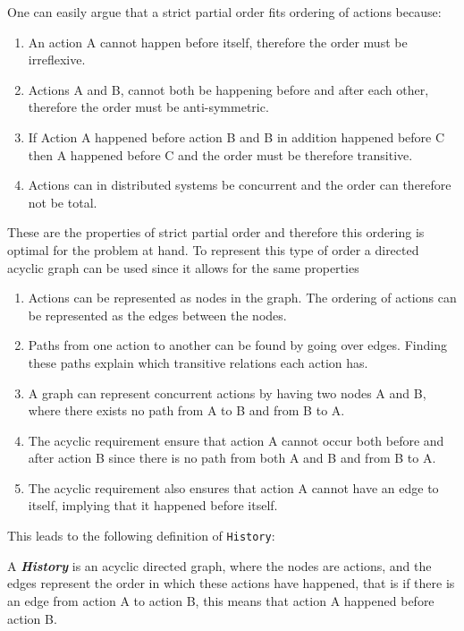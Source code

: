 	\newpar One can easily argue that a strict partial order fits ordering of actions because:
	\begin{enumerate}
		\item An action A cannot happen before itself, therefore the order must be irreflexive.
		\item Actions A and B, cannot both be happening before and after each other, therefore the order must be anti-symmetric.
		\item If Action A happened before action B and B in addition happened before C then A happened before C and the order must be therefore transitive.
		\item Actions can in distributed systems be concurrent and the order can therefore not be total.
	\end{enumerate}
	\newpar These are the properties of strict partial order and therefore this ordering is optimal for the problem at hand. To represent this type of order a directed acyclic graph can be used since it allows for the same properties
	\begin{enumerate}
		\item Actions can be represented as nodes in the graph. The ordering of actions can be represented as the edges between the nodes.
		\item Paths from one action to another can be found by going over edges. Finding these paths explain which transitive relations each action has.
		\item A graph can represent concurrent actions by having two nodes A and B, where there exists no path from A to B and from B to A.
		\item The acyclic requirement ensure that action A cannot occur both before and after action B since there is no path from both A and B and from B to A.
		\item The acyclic requirement also ensures that action A cannot have an edge to itself, implying that it happened before itself.
	\end{enumerate}
	
	\newpar This leads to the following definition of \texttt{History}:
	
	\begin{definition}
		A \textit{\textbf{History}} is an acyclic directed graph, where the nodes are actions, and the edges represent the order in which these actions have happened, that is if there is an edge from action A to action B, this means that action A happened before action B.
	\end{definition}
	
